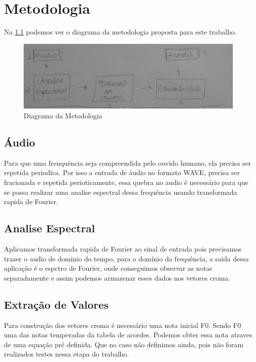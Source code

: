 \chapter{Metodologia}
\label{cap:metodologia}


Na \cref{metodologia} podemos ver o diagrama da metodologia proposta para este trabalho.

\begin{figure}[!htb]
     \centering
     \includegraphics[scale=0.15]{figuras/IMG_20171110_144014.jpg}
     \caption{Diagrama da Metodologia}
     \label{metodologia}
\end{figure} 


\section{Áudio}
\label{cap:audio}
Para que uma frenquência seja compreendida pelo ouvido humano, ela precisa ser repetida periodica. Por isso a entrada de áudio no formato WAVE, precisa ser fracionada e repetida perioticamente, essa quebra no audio é necessário para que se possa realizar uma analise espectral dessa frequência usando transformada rapida de Fourier.


\section{Analise Espectral}
\label{cap:analise:espectral}
Aplicamos transformada rapida de Fourier ao sinal de entrada pois precisamos trazer o audio de dominio do tempo, para o domínio da frequência, a saida dessa aplicação é o espctro de Fourier, onde conseguimos observar as notas separadamente e assim podemos armazenar esses dados nos vetores croma.


\section{Extração de Valores}
\label{cap:extraçaõ:valores}
Para construção dos vetores croma é necessário uma nota inicial F0.
Sendo F0 uma das notas temperadas da tabela de acordes. Podemos obter essa nota atraves de uma equação pré definida.
Que no caso não definimos ainda, pois não foram realizados testes nessa etapa do trabalho.

